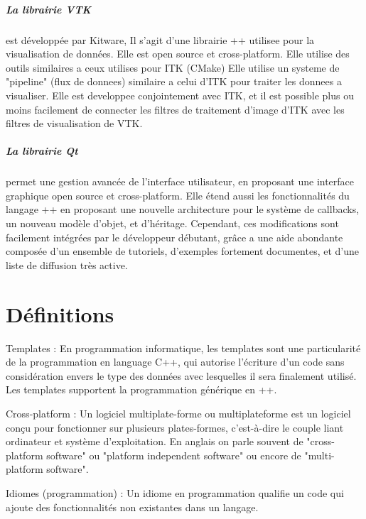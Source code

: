 \paragraph{La librairie VTK} est développée par Kitware, Il s'agit d'une librairie \C++ utilisee pour la visualisation de données. Elle est open source et cross-platform. Elle utilise des outils similaires a ceux utilises pour ITK (CMake)
Elle utilise un systeme de "pipeline" (flux de donnees) similaire a celui d'ITK pour traiter les donnees a visualiser. Elle est developpee conjointement avec ITK, et il est possible plus ou moins facilement de connecter les filtres de traitement d'image d'ITK avec les filtres de visualisation de VTK.

\paragraph{La librairie Qt} permet une gestion avancée de l'interface utilisateur, en proposant une interface graphique open source et cross-platform.
Elle étend aussi les fonctionnalités du langage \C++ en proposant une nouvelle architecture pour le système de callbacks, un nouveau modèle d'objet, et d'héritage. Cependant, ces modifications sont facilement intégrées par le développeur débutant, grâce a une aide abondante composée d'un ensemble de tutoriels, d'exemples fortement documentes, et d'une liste de diffusion très active.







\chapter{Définitions}




Templates : En programmation informatique, les templates sont une particularité de la programmation en language C++, qui autorise l'écriture d'un code sans considération envers le type des données avec lesquelles il sera finalement utilisé. Les templates supportent la programmation générique en {\C++}.

Cross-platform : Un logiciel multiplate-forme ou multiplateforme est un logiciel conçu pour fonctionner sur plusieurs plates-formes, c’est-à-dire le couple liant ordinateur et système d’exploitation. En anglais on parle souvent de "cross-platform software" ou "platform independent software" ou encore de "multi-platform software".

Idiomes (programmation) :  Un idiome en programmation qualifie un code qui ajoute des fonctionnalités non existantes dans un
langage.

